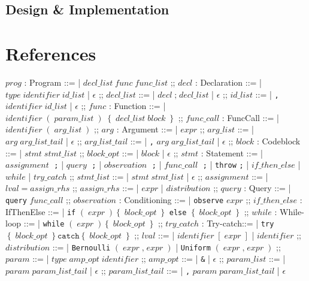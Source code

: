 \documentclass[11pt]{report}
\def\code#1{\texttt{#1}}
\begin{document}
\begin{refsection}
  \part{Design \& Implementation}
  
\end{refsection}

\cleardoublepage
\part{References}
\printbibliography[heading=subbibliography,title={References for Part I},section=1]
\printbibliography[heading=subbibliography,title={References for Part II},section=2]


\appendix

\begin{bnf}
  $prog$ : \textsf{Program} ::=
  | $decl\_list\; func\; func\_list$
  ;;
  $decl$ : \textsf{Declaration} ::=
  | $type\; identifier\; id\_list$
  | $\epsilon$
  ;;
  $decl\_list$ ::=
  | $decl\; \code{;}\; decl\_list$
  | $\epsilon$
  ;;
  $id\_list$ ::=
  | \code{,}\; $identifier\; id\_list$
  | $\epsilon$
  ;;
  $func$ : \textsf{Function} ::=
  | $identifier\; \left(\; param\_list\; \right)\; \left\{\; decl\_list\; block\; \right\}$
  ;;
  $func\_call$ : \textsf{Func\-Call} ::=
  | $identifier\; \left(\; arg\_list\; \right)$
  ;;
  $arg$ : \textsf{Argument} ::=
  | $expr$
  ;;
  $arg\_list$ ::=
  | $arg\; arg\_list\_tail$
  | $\epsilon$
  ;;
  $arg\_list\_tail$ ::=
  | \code{,} $arg\; arg\_list\_tail$
  | $\epsilon$
  ;;
  $block$ : \textsf{Codeblock} ::=
  | $stmt\; stmt\_list$
  ;;
  $block\_opt$ ::=
  | $block$
  | $\epsilon$
  ;;
  $stmt$ : \textsf{Statement} ::=
  | $assignment\;$ \code{;}
  | $query\;$ \code{;}
  | $observation\;$ \code{;}
  | $func\_call\;$ \code{;}
  | \code{throw} \code{;}
  | $if\_then\_else$
  | $while$
  | $try\_catch$
  ;;
  $stmt\_list$ ::=
  | $stmt\; stmt\_list$
  | $\epsilon$
  ;;
  $assignment$ ::=
  | $lval\; \code{=}\; assign\_rhs$
  ;;
  $assign\_rhs$ ::=
  | $expr$
  | $distribution$
  ;;
  $query$ : \textsf{Query} ::=
  | \code{query} $func\_call$
  ;;
  $observation$ : \textsf{Conditioning} ::=
  | \code{observe} $expr$
  ;;
  $if\_then\_else$ : \textsf{IfThenElse} ::=
  | \code{if} $\left(\; expr\; \right) \left\{\; block\_opt\; \right\}$ \code{else} $\left\{\; block\_opt\; \right\}$
  ;;
  $while$ : \textsf{While-loop} ::=
  | \code{while} $\left(\; expr\; \right) \left\{\; block\_opt\; \right\}$
  ;;
  $try\_catch$ : \textsf{Try-catch}::=
  | \code{try} $\left\{\; block\_opt\; \right\} \code{catch} \left\{\; block\_opt\; \right\}$
  ;;
  $lval$ ::=
  | $identifier\;\left[\;expr\;\right]$
  | $identifier$
  ;;
  $distribution$ ::=
  | \code{Bernoulli} $\left(\;expr\;\code{,}\;expr\;\right)$
  | \code{Uniform}   $\left(\;expr\;\code{,}\;expr\;\right)$
  ;;
  $param$ ::=
  | $type\;amp\_opt\;identifier$
  ;;
  $amp\_opt$ ::=
  | \code{\&}
  | $\epsilon$
  ;;
  $param\_list$ ::=
  | $param\;param\_list\_tail$
  | $\epsilon$
  ;;
  $param\_list\_tail$ ::=
  | \code{,} $param\;param\_list\_tail$
  | $\epsilon$
\end{bnf}
\end{document}
